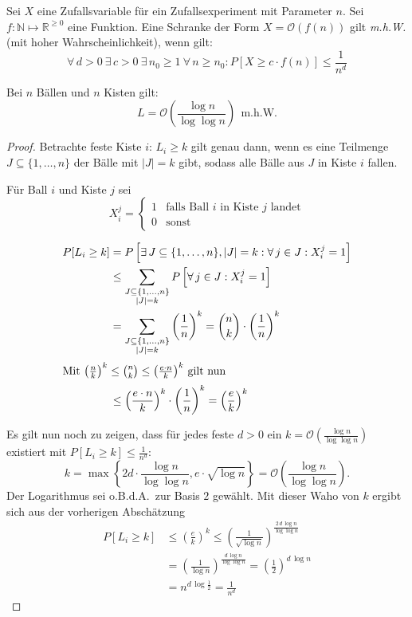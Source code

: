\begin{defn}
	Sei $X$ eine Zufallsvariable für ein Zufallsexperiment mit Parameter
	$n$. Sei $f : \mathbb{N} \mapsto \mathbb{R}^{\geq 0}$ eine Funktion.
	Eine Schranke der Form $X = \mathcal{O}\left(f(n)\right)$ gilt
	\emph{m.h.W.} (mit hoher Wahrscheinlichkeit), wenn gilt:
	\[ \forall\,d > 0 \ \exists\,c > 0 \ \exists\,n_0 \geq 1 \ \forall\,n
	\geq n_0 : P\left[ X \geq c \cdot f(n)\right] \leq \frac{1}{n^d} \]
\end{defn}
\begin{satz}
	Bei $n$ Bällen und $n$ Kisten gilt:
	\[ L = \mathcal{O}\left(\frac{\log n}{\log \log n}\right) \ \
	\text{m.h.W.} \]
\end{satz}
\begin{proof}
	Betrachte feste Kiste $i$: $L_i \geq k$ gilt genau dann, wenn es eine
	Teilmenge $J \subseteq \{1, \dots, n \}$ der Bälle mit $|J| = k$ gibt,
	sodass alle Bälle aus $J$ in Kiste $i$ fallen.

	Für Ball $i$ und Kiste $j$ sei
	\[
	  X_i^j = \begin{cases} 1 & \text{falls Ball $i$ in Kiste $j$ landet}\\
		  0 & \text{sonst} \end{cases}
	\]

	\begin{align*}
	  P[L_i \geq k] &= P\left[ \exists\,J \subseteq \{1, \dots, n\}, |J| =
	  k : \forall\,j \in J : X_i^j = 1 \right] \\
	  &\leq \sum_{\substack{J\subseteq\{1,\dots,n\}\\|J|=k}}
	  P\left[\forall\,j \in J : X_i^j = 1\right] \\
	  &= \sum_{\substack{J\subseteq\{1,\dots,n\}\\|J|=k}}
	  \left(\frac{1}{n}\right)^k = \binom{n}{k} \cdot \left(\frac{1}{n}\right)^k \\
	  \intertext{Mit $\left(\frac{n}{k}\right)^k \leq \binom{n}{k} \leq
	  \left(\frac{e\cdot n}{k}\right)^k$ gilt nun}
	  &\leq \left( \frac{e\cdot n}{k} \right)^k \cdot \left( \frac{1}{n}
	  \right)^k = \left( \frac{e}{k} \right)^k
	\end{align*}

	Es gilt nun noch zu zeigen, dass für jedes feste $d > 0$ ein $k =
	\mathcal{O}\left(\frac{\log n}{\log \log n}\right)$ existiert mit
	$P[L_i \geq k] \leq \frac{1}{n^d}$:
	\[
	  k = \max \left\{ 2 d \cdot \frac{\log n}{\log \log n}, e \cdot
	  \sqrt{\log n} \right\} = \mathcal{O}\left(\frac{\log n}{\log \log
	  n}\right).
	\]
	Der Logarithmus sei o.B.d.A.\ zur Basis $2$ gewählt. Mit dieser Waho
	von $k$ ergibt sich aus der vorherigen Abschätzung
	\begin{align*}
		P[L_i \geq k] &\leq \left(\frac{e}{k}\right)^k \leq \left(
		\frac{1}{\sqrt{\log n}} \right)^{\frac{2\,d\,\log n}{\log \log
		n}} \\
		&= \left( \frac{1}{\log n} \right)^{\frac{d\,\log
		n}{\log \log n}} = \left(\frac{1}{2}\right)^{d\,\log n} \\
		&= n^{d\,\log \frac{1}{2}} = \frac{1}{n^d}
	\end{align*}
	

\end{proof}

